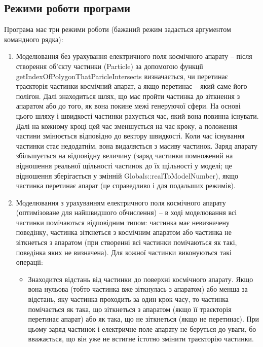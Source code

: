 \documentclass[a4paper,12pt]{article}
\begin{document}
\subsection{Режими роботи програми} \label{sec:modes}
Програма має три режими роботи (бажаний режим задається аргументом командного рядка):
\begin{enumerate}
\item Моделювання без урахування електричного поля космічного апарату -- після створення об’єкту частинки (Particle) за допомогою функції getIndexOfPolygonThatParicleIntersects визначається, чи перетинає траєкторія частинки космічний апарат, а якщо перетинає -- який саме його полігон. Далі знаходиться шлях, що має пройти частинка до зіткнення з апаратом або до того, як вона покине межі генеруючої сфери. На основі цього шляху і швидкості частинки рахується час, який вона повинна існувати. Далі на кожному кроці цей час зменшується на час кроку, а положення частини змінюється відповідно до вектору швидкості. Коли час існування частинки стає недодатнім, вона видаляється з масиву частинок. Заряд апарату збільшується на відповідну величину (заряд частинки помножений на відношення реальної щільності частинок до їх щільності у моделі; це відношення зберігається у змінній Globals::realToModelNumber), якщо частинка перетинає апарат (це справедливо і для подальших режимів).

\item Моделювання з урахуванням електричного поля космічного апарату (оптимізоване для найшвидшого обчислення) -- в ході моделювання всі частинки помічаються відповідним типом: частинка має невизначену поведінку, частинка зіткнеться з космічним апаратом або частинка не зіткнеться з апаратом (при створенні всі частинки помічаються як такі, поведінка яких не визначена). Для кожної частинки виконуються такі операції:

\begin{itemize}
\item Знаходится відстань від частинки до поверхні космічного апарату. Якщо вона нульова (тобто частинка вже зіткнулась з апаратом) або менша за відстань, яку частинка проходить за один крок часу, то частинка помічається як така, що зіткнеться з апаратом (якщо її траєкторія перетинає апарат) або як така, що не зіткнеться (якщо не перетинає). При цьому заряд частинок і електричне поле апарату не беруться до уваги, бо вважається, що він уже не встигне істотно змінити траєкторію частинки.


\end{itemize}
\end{enumerate}
\end{document}
